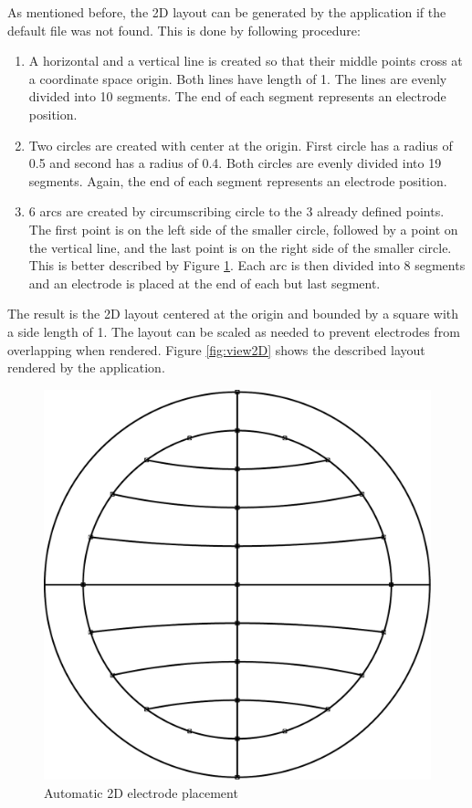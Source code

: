 As mentioned before, the 2D layout can be generated by the application if the default file was not found. This is done by following procedure:
\begin{enumerate}
	\item A horizontal and a vertical line is created so that their middle points cross at a coordinate space origin. Both lines have length of 1. The lines are evenly divided into 10 segments. The end of each segment represents an electrode position.
	\item Two circles are created with center at the origin. First circle has a radius of 0.5 and second has a radius of 0.4. Both circles are evenly divided into 19 segments. Again, the end of each segment represents an electrode position.
	\item 6 arcs are created by circumscribing circle to the 3 already defined points. The first point is on the left side of the smaller circle, followed by a point on the vertical line, and the last point is on the right side of the smaller circle. This is better described by Figure \ref{fig:2dplace}. Each arc is then divided into 8 segments and an electrode is placed at the end of each but last segment. 
\end{enumerate}
The result is the 2D layout centered at the origin and bounded by a square with a side length of 1. The layout can be scaled as needed to prevent electrodes from overlapping when rendered. Figure \ref{fig:view2D} shows the described layout rendered by the application. 

\begin{figure}[htb]
	\centering
	\includegraphics[width=0.5\linewidth]{fig/2dplace.pdf}
	\caption{Automatic 2D electrode placement}
	\label{fig:2dplace}
\end{figure}

